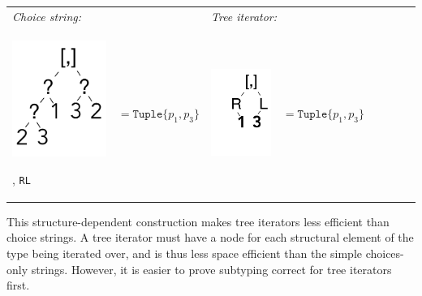 \documentclass[a4paper,english]{lipics-v2019}
\newcommand{\xt}[1]{\texttt{#1}}
\renewcommand{\L}{{\tt L}\xspace}
\newcommand{\R}{{\tt R}\xspace}
\newcommand{\tuple}[1]{\xt{Tuple\{}#1\xt{\}}}
\begin{document}
\medskip
{\small
\begin{tabular}{@{}l@{~}ll@{~}ll@{~}ll@{~}l}
\it Choice string: &&  \multicolumn{2}{l}{\it Tree iterator:}\\[2mm]
\begin{minipage}{1.2cm}\includegraphics[scale=.25]{figures/tree1.pdf} 
\end{minipage} , \R\L & $ =   \tuple{p_1,p_3} $ 
&\begin{minipage}{1.2cm}\includegraphics[scale=.25]{figures/tree8.pdf}
\end{minipage}& $=\tuple{p_1,p_3}$
\end{tabular}}

\noindent
This structure-dependent construction makes tree iterators less efficient
than choice strings. A tree iterator must have a node for each structural
element of the type being iterated over, and is thus less space efficient
than the simple choices-only strings. However, it is easier to prove
subtyping correct for tree iterators first.
\end{document}
